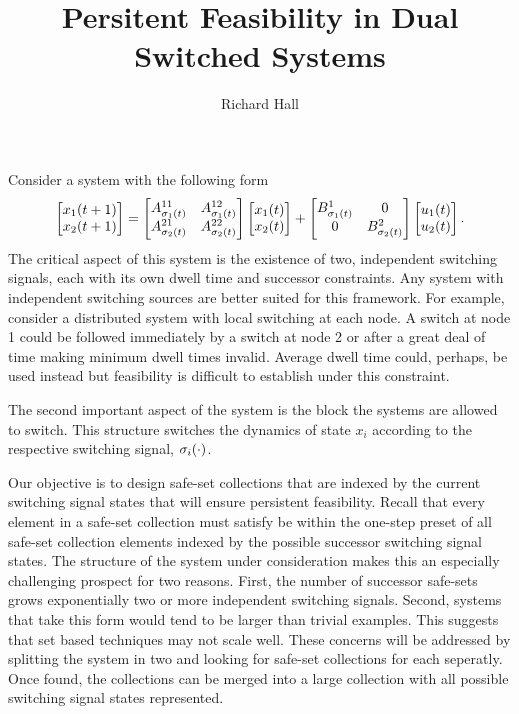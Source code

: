 \documentclass[10pt,a4paper]{article}
\author{Richard Hall}
\title{Persitent Feasibility in Dual Switched Systems}
\begin{document}
\maketitle
Consider a system with the following form
\begin{equation}
\begin{bmatrix}x_1(t+1)\\x_2(t+1)\end{bmatrix} = \begin{bmatrix}A_{\ss_1(t)}^{11} & A_{\ss_1(t)}^{12}\\A_{\ss_2(t)}^{21} & A_{\ss_2(t)}^{22}\end{bmatrix}\begin{bmatrix}x_1(t)\\x_2(t)\end{bmatrix}+\begin{bmatrix}B_{\ss_1(t)}^{1} & 0 \\0 & B_{\ss_2(t)}^{2}\end{bmatrix}\begin{bmatrix}u_1(t)\\u_2(t)\end{bmatrix}.
\end{equation}
The critical aspect of this system is the existence of two, independent switching signals, each with its own dwell time and successor constraints. Any system with independent switching sources are better suited for this framework. For example, consider a distributed system with local switching at each node. A switch at node 1 could be followed immediately by a switch at node 2 or after a great deal of time making minimum dwell times invalid. Average dwell time could, perhaps, be used instead but feasibility is difficult to establish under this constraint. 

The second important aspect of the system is the block the systems are allowed to switch. This structure switches the dynamics of state $x_i$ according to the respective switching signal, $\ss_i(\cdot)$. 

Our objective is to design safe-set collections that are indexed by the current switching signal states that will ensure persistent feasibility. Recall that every element in a safe-set collection must satisfy be within the one-step preset of all safe-set collection elements indexed by the possible successor switching signal states. The structure of the system under consideration makes this an especially challenging prospect for two reasons. First, the number of successor safe-sets grows exponentially two or more independent switching signals. Second, systems that take this form would tend to be larger than trivial examples. This suggests that set based techniques may not scale well. These concerns will be addressed by splitting the system in two and looking for safe-set collections for each seperatly. Once found, the collections can be merged into a large collection with all possible switching signal states represented.
\end{document}
